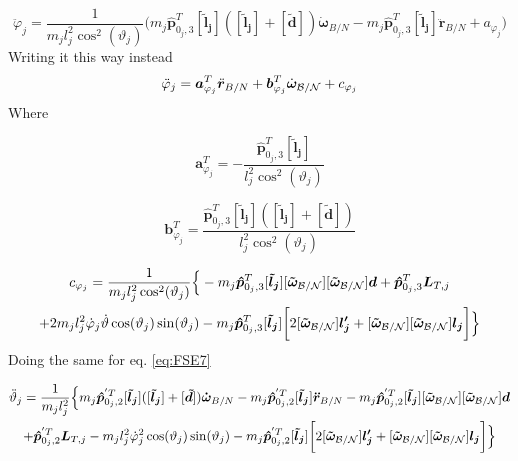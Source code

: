\begin{equation}
	\ddot{\varphi}_j  =\frac{1}{m_j l_j^2 \cos^2(\vartheta_j)}\Big(m_{j}\bm{\hat{p}}_{0_j,3}^T [\bm{\tilde{l}_j}](  [\bm{\tilde{l}_j}]+ [\bm{\tilde{d}}]) \bm{\dot{\omega}}_{B/N} -m_{j} \bm{\hat{p}}_{0_j,3}^{T} [\bm{\tilde{l}_j}] \bm{\ddot{r}}_{B/N}+a_{\varphi_j} \Big)
	\label{eq:BSM2}
\end{equation}
Writing it this way instead
\begin{equation}
	\ddot{\varphi}_j  = \bm a_{\varphi_j}^T \ddot{\bm{r}}_{B/N} + \bm b_{\varphi_j}^T \dot{\bm\omega}_{\cal B/N} +c_{\varphi_j}
	\label{eq:BSM3}
\end{equation}
Where

\begin{equation}
	\bm a_{\varphi_j}^{T} = -\frac{\bm{\hat{p}}_{0_j,3}^{T} [\bm{\tilde{l}_j}]}{ l_j^2 \cos^2(\vartheta_j)}
	\label{eq:BSM4}
\end{equation}

\begin{equation}
	\bm b_{\varphi_j}^{T} = \frac{\bm{\hat{p}}_{0_j,3}^T [\bm{\tilde{l}_j}]( [\bm{\tilde{l}_j}]+ [\bm{\tilde{d}}])}{ l_j^2 \cos^2(\vartheta_j)}
	\label{eq:BSM5}
\end{equation}

\begin{multline}
	c_{\varphi_j} = \frac{1}{m_j l_j^2 \cos^2(\vartheta_j)}\Big\{-m_{j} \bm{\hat{p}}_{0_j,3}^{T} [\bm{\tilde{l}_j}][\bm{\tilde{\omega}}_{\cal B/N}][\bm{\tilde{\omega}}_{\cal B/N}] \bm{d}+\bm{\hat{p}}_{0_j,3}^T \bm{L}_{T,j}\\+2m_j l_j^2\dot{\varphi}_j\dot{\vartheta}\cos(\vartheta_j)\sin(\vartheta_j)- m_j \bm{\hat{p}}_{0_j,3}^T [\bm{\tilde{l}_j}]\bigg[2[\bm{\tilde{\omega}}_{\cal B/N}] \bm{l_j'}+[\bm{\tilde{\omega}}_{\cal B/N}][\bm{\tilde{\omega}}_{\cal B/N}] \bm{l_j}\bigg]\Big\}
	\label{eq:BSM6}
\end{multline}
Doing the same for eq. \eqref{eq:FSE7}

\begin{multline}
	\ddot{\vartheta}_j
	=\frac{1}{m_j l_j^2}\Big\{m_{j}\bm{\hat{p}}_{0_j,2}^{'T} [\bm{\tilde{l}_j}]( [\bm{\tilde{l}_j}] + [\bm{\tilde{d}}])\bm{\dot{\omega}}_{B/N}
	-m_{j} \bm{\hat{p}}_{0_j,2}^{'T} [\bm{\tilde{l}_j}] \bm{\ddot{r}}_{B/N}-m_{j} \bm{\hat{p}}_{0_j,2}^{'T}[\bm{\tilde{l}_j}][\bm{\tilde{\omega}}_{\cal B/N}][\bm{\tilde{\omega}}_{\cal B/N}] \bm{d}\\+\bm{\hat{p}}_{0_j,2}^{'T} \bm{L}_{T,j}-m_j l_j^2\dot{\varphi}_j^2\cos(\vartheta_j)\sin(\vartheta_j)- m_j \bm{\hat{p}}_{0_j,2}^{'T} [\bm{\tilde{l}_j}]\bigg[2[\bm{\tilde{\omega}}_{\cal B/N}] \bm{l_j'}+[\bm{\tilde{\omega}}_{\cal B/N}][\bm{\tilde{\omega}}_{\cal B/N}] \bm{l_j}\bigg]\Big\}
	\label{eq:BSM7}
\end{multline}

